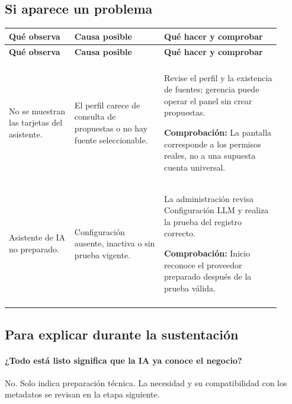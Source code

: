 \subsection{Si aparece un problema}
\begingroup
\fontsize{10}{12.5}\selectfont
\setlength{\tabcolsep}{5pt}
\renewcommand{\arraystretch}{1.15}
\begin{longtable}{@{}>{\RaggedRight\arraybackslash}p{0.22\linewidth}>{\RaggedRight\arraybackslash}p{0.3\linewidth}>{\RaggedRight\arraybackslash}p{0.39\linewidth}@{}}
\toprule
\textbf{Qué observa} & \textbf{Causa posible} & \textbf{Qué hacer y comprobar} \\
\midrule
\endfirsthead
\toprule
\textbf{Qué observa} & \textbf{Causa posible} & \textbf{Qué hacer y comprobar} \\
\midrule
\endhead
\midrule
\multicolumn{3}{r}{\footnotesize Continúa en la página siguiente}\\
\endfoot
\bottomrule
\endlastfoot
No se muestran las tarjetas del asistente. & El perfil carece de consulta de propuestas o no hay fuente seleccionable. & Revise el perfil y la existencia de fuentes; gerencia puede operar el panel sin crear propuestas.\par\smallskip\textbf{Comprobación:} La pantalla corresponde a los permisos reales, no a una supuesta cuenta universal. \\
\addlinespace[3pt]
Asistente de IA no preparado. & Configuración ausente, inactiva o sin prueba vigente. & La administración revisa Configuración LLM y realiza la prueba del registro correcto.\par\smallskip\textbf{Comprobación:} Inicio reconoce el proveedor preparado después de la prueba válida. \\
\addlinespace[3pt]
\end{longtable}
\endgroup

\subsection{Para explicar durante la sustentación}
\paragraph{¿Todo está listo significa que la IA ya conoce el negocio?} No. Solo indica preparación técnica. La necesidad y su compatibilidad con los metadatos se revisan en la etapa siguiente.


